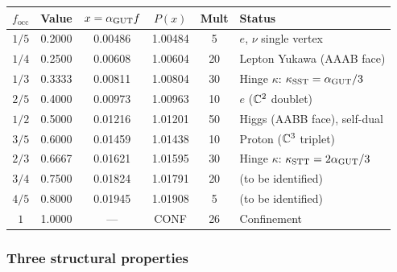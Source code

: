 \begin{center}
\begin{tabular}{cccccl}
\hline
$f_\mathrm{occ}$ & Value & $x = \alpha_{\mathrm{GUT}} f$ & $P(x)$ & Mult & Status \\
\hline
$1/5$ & 0.2000 & 0.00486 & 1.00484 & 5 & $e$, $\nu$ single vertex \\
$1/4$ & 0.2500 & 0.00608 & 1.00604 & 20 & Lepton Yukawa (AAAB face) \\
$1/3$ & 0.3333 & 0.00811 & 1.00804 & 30 & Hinge $\kappa$: $\kappa_\mathrm{SST} = \alpha_{\mathrm{GUT}}/3$ \\
$2/5$ & 0.4000 & 0.00973 & 1.00963 & 10 & $e$ ($\mathbb{C}^2$ doublet) \\
$1/2$ & 0.5000 & 0.01216 & 1.01201 & 50 & Higgs (AABB face), self-dual \\
$3/5$ & 0.6000 & 0.01459 & 1.01438 & 10 & Proton ($\mathbb{C}^3$ triplet) \\
$2/3$ & 0.6667 & 0.01621 & 1.01595 & 30 & Hinge $\kappa$: $\kappa_\mathrm{STT} = 2\alpha_{\mathrm{GUT}}/3$ \\
$3/4$ & 0.7500 & 0.01824 & 1.01791 & 20 & (to be identified) \\
$4/5$ & 0.8000 & 0.01945 & 1.01908 & 5 & (to be identified) \\
$1$   & 1.0000 & ---     & CONF    & 26 & Confinement \\
\hline
\end{tabular}
\end{center}

\subsubsection{Three structural properties}

